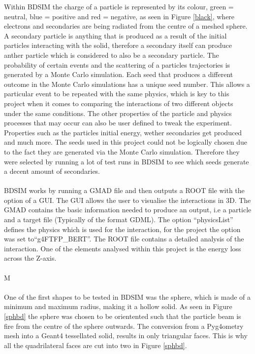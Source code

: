\documentclass[12pt,a4paper]{article}
\begin{document}
\noindent Within BDSIM the charge of a particle is represented by its colour, green = neutral, blue = positive and red = negative, as seen in Figure \ref{black}, where electrons and secondaries are being radiated from the centre of a meshed sphere. A secondary particle is anything that is produced as a result of the initial particles interacting with the solid, therefore a secondary itself can produce anther particle which is considered to also be  a secondary particle. The probability of certain events and the scattering of a particles trajectories is generated by a Monte Carlo simulation. Each seed that produces a different outcome in the Monte Carlo simulations has a unique seed number. This allows a particular event to be repeated with the same physics, which is key to this project when it comes to comparing the interactions of two different objects under the same conditions. The other properties of the particle and physics processes that may occur can also be user defined to tweak the experiment. Properties such as the particles initial energy, wether secondaries get produced and much more. The seeds used in this project could not be logically chosen due to the fact they are generated via the Monte Carlo simulation. Therefore they were selected by running a lot of test runs in BDSIM to see which seeds generate a decent amount of secondaries.
\\\\
BDSIM works by running a GMAD file and then outputs  a ROOT file with the option of a GUI. The GUI allows the user to visualise the interactions in 3D. The GMAD contains the basic information needed to produce an output, i.e a particle and a target file (Typically of the format GDML). The option ``physicsList'' defines the physics which is used for the interaction, for the project the option was set to``g4FTFP\_BERT''. The ROOT file contains a detailed analysis of the interaction. One of the elements analysed within this project is the energy loss across the Z-axis.
\\\\
M\\\\
One of the first shapes to be tested in BDSIM was the sphere, which is made of a minimum and maximum radius, making it a hollow solid. As seen in Figure \ref{sphbd} the sphere was chosen to be orientented such that the particle beam is fire from the centre of the sphere outwards. The conversion from a Pyg4ometry mesh into a Geant4 tessellated solid, results in only triangular faces. This is why all the quadrilateral faces are cut into two in Figure \ref{sphbd}.
\end{document}
